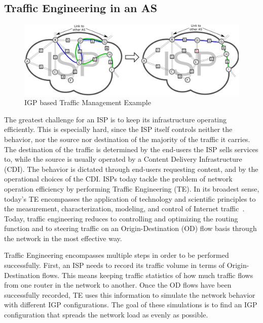 \subsection{Traffic Engineering in an AS}

\begin{figure} \begin{center}
\includegraphics[width=1\linewidth]{figures-pdf/Classic-TE} 
\end{center} 
\caption{IGP based Traffic Management Example} 
\label{fig:SimplifiedTE} 
\end{figure}

The greatest challenge for an ISP is to keep its infrastructure operating
efficiently. This is especially hard, since the ISP itself controls neither the
behavior, nor the source nor destination of the majority of the traffic it
carries. The destination of the traffic is determined by the end-users the ISP
sells services to, while the source is usually operated by a Content Delivery
Infrastructure (CDI). The behavior is dictated through end-users requesting
content, and by the operational choices of the CDI. ISPs today tackle the
problem of network operation efficiency by performing Traffic Engineering (TE).
In its broadest sense, today's TE encompasses the application of technology and
scientific principles to the measurement, characterization, modeling, and
control of Internet traffic~\cite{Awduche_OverviewTE:2002}. Today, traffic
engineering reduces to controlling and optimizing the routing function and to
steering traffic on an Origin-Destination (OD) flow basis through the network
in the most effective way.

Traffic Engineering encompasses multiple steps in order to be performed
successfully. First, an ISP needs to record its traffic volume in terms of
Origin-Destination flows. This means keeping traffic statistics of how much
traffic flows from one router in the network to another. Once the OD flows have
been successfully recorded, TE uses this information to simulate the network
behavior with different IGP configurations. The goal of these simulations is to
find an IGP configuration that spreads the network load as evenly as possible.

